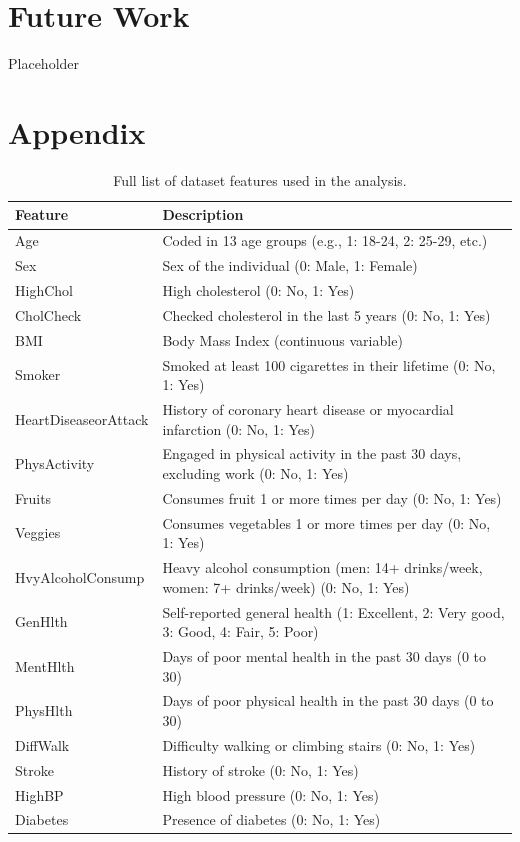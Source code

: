 \documentclass[a4paper,12pt]{article}
\begin{document}
\section{Future Work}
Placeholder

\clearpage

\appendix
\section*{Appendix}

\begin{table}[h!]
    \centering
    \begin{tabularx}{\textwidth}{|l|X|}
    \hline
    \textbf{Feature} & \textbf{Description} \\ \hline
    Age & Coded in 13 age groups (e.g., 1: 18-24, 2: 25-29, etc.) \\ \hline
    Sex & Sex of the individual (0: Male, 1: Female) \\ \hline
    HighChol & High cholesterol (0: No, 1: Yes) \\ \hline
    CholCheck & Checked cholesterol in the last 5 years (0: No, 1: Yes) \\ \hline
    BMI & Body Mass Index (continuous variable) \\ \hline
    Smoker & Smoked at least 100 cigarettes in their lifetime (0: No, 1: Yes) \\ \hline
    HeartDiseaseorAttack & History of coronary heart disease or myocardial infarction (0: No, 1: Yes) \\ \hline
    PhysActivity & Engaged in physical activity in the past 30 days, excluding work (0: No, 1: Yes) \\ \hline
    Fruits & Consumes fruit 1 or more times per day (0: No, 1: Yes) \\ \hline
    Veggies & Consumes vegetables 1 or more times per day (0: No, 1: Yes) \\ \hline
    HvyAlcoholConsump & Heavy alcohol consumption (men: 14+ drinks/week, women: 7+ drinks/week) (0: No, 1: Yes) \\ \hline
    GenHlth & Self-reported general health (1: Excellent, 2: Very good, 3: Good, 4: Fair, 5: Poor) \\ \hline
    MentHlth & Days of poor mental health in the past 30 days (0 to 30) \\ \hline
    PhysHlth & Days of poor physical health in the past 30 days (0 to 30) \\ \hline
    DiffWalk & Difficulty walking or climbing stairs (0: No, 1: Yes) \\ \hline
    Stroke & History of stroke (0: No, 1: Yes) \\ \hline
    HighBP & High blood pressure (0: No, 1: Yes) \\ \hline
    Diabetes & Presence of diabetes (0: No, 1: Yes) \\ \hline
    \end{tabularx}
    \caption{Full list of dataset features used in the analysis.}
    \label{tab:feature_list}
\end{table}

\printbibliography
\end{document}
